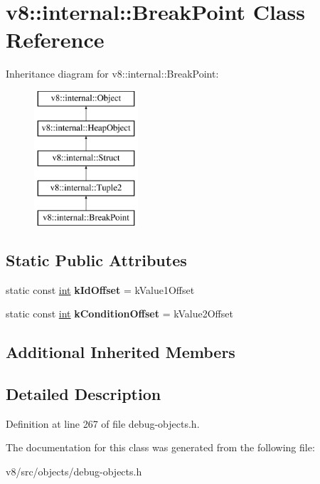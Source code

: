 \hypertarget{classv8_1_1internal_1_1BreakPoint}{}\section{v8\+:\+:internal\+:\+:Break\+Point Class Reference}
\label{classv8_1_1internal_1_1BreakPoint}
Inheritance diagram for v8\+:\+:internal\+:\+:Break\+Point\+:\begin{figure}[H]
\begin{center}
\leavevmode
\includegraphics[height=5.000000cm]{classv8_1_1internal_1_1BreakPoint}
\end{center}
\end{figure}
\subsection*{Static Public Attributes}
\begin{DoxyCompactItemize}
\item 
\mbox{\label{classv8_1_1internal_1_1BreakPoint_ae0668d1fee5276ff688c3fe1f676956e}} 
static const \mbox{\hyperlink{classint}{int}} {\bfseries k\+Id\+Offset} = k\+Value1\+Offset
\item 
\mbox{\label{classv8_1_1internal_1_1BreakPoint_a2aad8e76eeefeead67d02a79b68043c9}} 
static const \mbox{\hyperlink{classint}{int}} {\bfseries k\+Condition\+Offset} = k\+Value2\+Offset
\end{DoxyCompactItemize}
\subsection*{Additional Inherited Members}


\subsection{Detailed Description}


Definition at line 267 of file debug-\/objects.\+h.



The documentation for this class was generated from the following file\+:\begin{DoxyCompactItemize}
\item 
v8/src/objects/debug-\/objects.\+h\end{DoxyCompactItemize}
